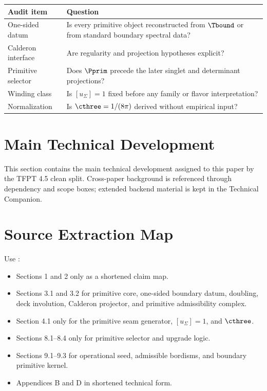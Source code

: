 \begin{center}
\begin{tabularx}{\textwidth}{@{}p{}Y@{}}
\toprule
\textbf{Audit item} & \textbf{Question} \\
\midrule
One-sided datum & Is every primitive object reconstructed from $\Tbound$ or from standard boundary spectral data? \\
Calderon interface & Are regularity and projection hypotheses explicit? \\
Primitive selector & Does $\Pprim$ precede the later singlet and determinant projections? \\
Winding class & Is $[u_\Sigma]=1$ fixed before any family or flavor interpretation? \\
Normalization & Is $\cthree=1/(8\pi)$ derived without empirical input? \\
\bottomrule
\end{tabularx}
\end{center}

\clearpage
\section{Main Technical Development}

This section contains the main technical development assigned to this paper by the TFPT 4.5 clean split. Cross-paper background is referenced through dependency and scope boxes; extended backend material is kept in the Technical Companion.



\section{Source Extraction Map}

\begin{tfptsourcebox}
Use \sourceDraft:
\begin{itemize}[leftmargin=1.5em]
    \item Sections 1 and 2 only as a shortened claim map.
    \item Sections 3.1 and 3.2 for primitive core, one-sided boundary datum, doubling, deck
    involution, Calderon projector, and primitive admissibility complex.
    \item Section 4.1 only for the primitive seam generator, $[u_\Sigma]=1$, and $\cthree$.
    \item Sections 8.1--8.4 only for primitive selector and upgrade logic.
    \item Sections 9.1--9.3 for operational seed, admissible bordisms, and boundary primitive
    kernel.
    \item Appendices B and D in shortened technical form.
\end{itemize}
\end{tfptsourcebox}

